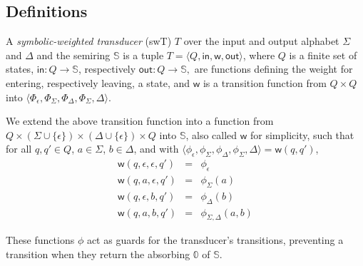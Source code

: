 \documentclass[runningheads]{llncs}
\def\<#1>{\langle #1 \rangle}
\newcommand{\Semiring}{\mathbb{S}}
\newcommand{\zero}{\mathbb{0}}
\def\SWT{\textsf{swT}\xspace}
\def\wei{\mathsf{w}}
\def\init{\mathsf{in}}
\def\final{\mathsf{out}}
\begin{document}
\subsection{Definitions}
\begin{definition}
A \emph{symbolic-weighted transducer} (\SWT) 
$T$ over the input and output alphabet $\Sigma$ and $\Delta$ 
and the semiring $\Semiring$ is a tuple
$T = \< Q, \init, \wei, \final >$,
where $Q$ is a finite set of states, 
$\mathsf{in} : Q \to \Semiring$, 
respectively $\mathsf{out} : Q \to \Semiring,$
are functions defining the weight for entering, 
respectively leaving, a state, 
and $\wei$ is a transition %
function from $Q \times Q$ into %
$\< \Phi_\epsilon, \Phi_\Sigma, \Phi_\Delta, \Phi_{\Sigma, \Delta}>$.
\end{definition}
%
We extend the above transition function into a function from
$Q \times (\Sigma \cup \{ \epsilon \}) \times (\Delta \cup \{ \epsilon \}) \times Q$
into $\Semiring$, also called $\wei$ for simplicity, such that 
for all $q, q' \in Q$, $a \in \Sigma$, $b \in \Delta$, 
and with 
$\< \phi_\epsilon, \phi_\Sigma, \phi_\Delta, \phi_{\Sigma, \Delta}> = \wei(q, q')$, 
\[
\begin{array}{rcl}
\wei(q, \epsilon, \epsilon, q') & = & \phi_\epsilon\\
\wei(q, a, \epsilon, q') & = & \phi_\Sigma(a)\\
\wei(q, \epsilon, b, q') & = & \phi_\Delta(b)\\
\wei(q, a, b, q') & = & \phi_{\Sigma, \Delta}(a, b)
\end{array}      
\]

These functions $\phi$ act as guards for the transducer's transitions, 
preventing a transition when they return the absorbing $\zero$ of $\Semiring$.
\end{document}
